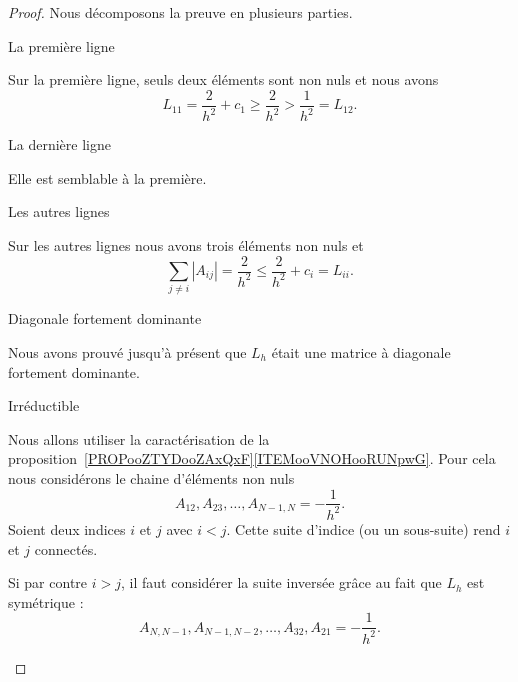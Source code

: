 	\begin{proof}
		Nous décomposons la preuve en plusieurs parties.
		\begin{subproof}
			\item[La première ligne]

			Sur la première ligne, seuls deux éléments sont non nuls et nous avons
			\begin{equation}
				L_{11}=\frac{ 2 }{ h^2 }+c_1\geq \frac{ 2 }{ h^2 }>\frac{1}{ h^2 }=L_{12}.
			\end{equation}

			\item[La dernière ligne]

			Elle est semblable à la première.

			\item[Les autres lignes]

			Sur les autres lignes nous avons trois éléments non nuls et
			\begin{equation}
				\sum_{j\neq i}| A_{ij} |=\frac{ 2 }{ h^2 }\leq \frac{ 2 }{ h^2 }+c_i=L_{ii}.
			\end{equation}

			\item[Diagonale fortement dominante]

			Nous avons prouvé jusqu'à présent que \( L_h\) était une matrice à diagonale fortement dominante.

			\item[Irréductible]

			Nous allons utiliser la caractérisation de la proposition~\ref{PROPooZTYDooZAxQxF}\ref{ITEMooVNOHooRUNpwG}. Pour cela nous considérons le chaine d'éléments non nuls
			\begin{equation}
				A_{12}, A_{23},\ldots, A_{N-1,N}=-\frac{1}{ h^2 }.
			\end{equation}
			Soient deux indices \( i\) et \( j\) avec \( i<j\). Cette suite d'indice (ou un sous-suite) rend \( i\) et \( j\) connectés.

			Si par contre \( i>j\), il faut considérer la suite inversée grâce au fait que \( L_h\) est symétrique :
			\begin{equation}
				A_{N,N-1},A_{N-1,N-2},\ldots, A_{32}, A_{21}=-\frac{ 1 }{ h^2 }.
			\end{equation}

		\end{subproof}
	\end{proof}

